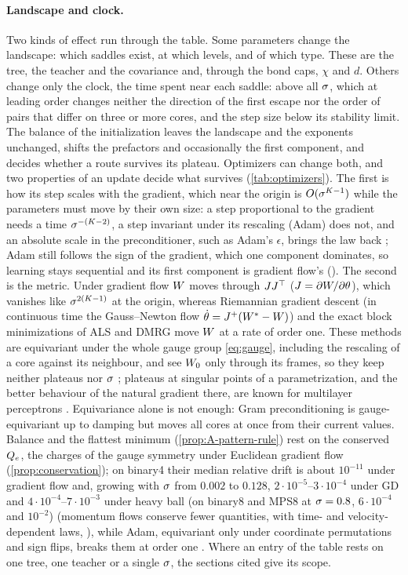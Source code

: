 \endgroup

\paragraph{Landscape and clock.}
Two kinds of effect run through the table. Some parameters change the landscape: which saddles exist,
at which levels, and of which type. These are the tree, the teacher and the covariance and, through the
bond caps, $\chi$ and $d$. Others change only the clock, the time spent near each saddle: above all
$\sigma$, which at leading order changes neither the direction of the first escape nor the order of pairs
that differ on three or more cores, and the step size below its stability limit. The balance of the
initialization leaves the landscape and the exponents unchanged, shifts the prefactors and occasionally
the first component, and decides whether a route survives its plateau. Optimizers can change both, and
two properties of an update decide what survives (\cref{tab:optimizers}). The first is how its step
scales with the gradient, which near the origin is $O(\sigma^{K-1})$ while the parameters must move by
their own size: a step proportional to the gradient needs a time $\sigma^{-(K-2)}$, a step invariant
under its rescaling (Adam) does not, and an absolute scale in the preconditioner, such as Adam's
$\epsilon$, brings the law back \derived; Adam still follows the sign of the gradient, which one
component dominates, so learning stays sequential and its first component is gradient flow's (\conjecture). The second is the metric. Under
gradient flow $W$ moves through $JJ^{\top}$ ($J=\partial W/\partial\theta$), which vanishes like
$\sigma^{2(K-1)}$ at the origin, whereas Riemannian gradient descent (in continuous time the
Gauss--Newton flow $\dot{\theta}=J^+(W^{*}-W)$) and the exact block minimizations of ALS and DMRG move
$W$ at a rate of order one. These methods are equivariant under the whole gauge group
\eqref{eq:gauge}, including the rescaling of a core against its neighbour, and see $W_{0}$ only through
its frames, so they keep neither plateaus \derived{} nor $\sigma$ \proven; plateaus at singular points of
a parametrization, and the better behaviour of the natural gradient there, are known for multilayer
perceptrons . Equivariance alone is not enough: Gram
preconditioning is gauge-equivariant up to damping \derived{} but moves all cores at once from their
current values. Balance and the flattest minimum (\cref{prop:A-pattern-rule}) rest on the conserved
$Q_{e}$, the charges of the gauge symmetry under Euclidean gradient flow (\cref{prop:conservation}); on
binary4 their median relative drift is about $10^{-11}$ under gradient flow and, growing with $\sigma$ from
$0.002$ to $0.128$, $2\cdot10^{-5}$--$3\cdot10^{-4}$ under GD and $4\cdot10^{-4}$--$7\cdot10^{-3}$ under heavy ball (on
binary8 and MPS8 at $\sigma=0.8$, $6\cdot10^{-4}$ and $10^{-2}$) (momentum flows conserve fewer quantities, with time- and velocity-dependent laws,
\citealp{marcotte2024keep}), while Adam, equivariant only under coordinate permutations and sign flips,
breaks them at order one \empirical. Where an entry of the table rests on one tree, one teacher or a
single $\sigma$, the sections cited give its scope.

